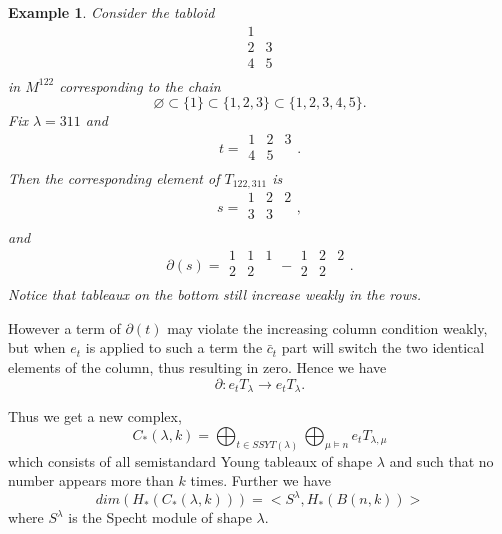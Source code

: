 \documentclass{amsart}
\newtheorem{example}[theorem]{Example}
\begin{document}
\begin{example}

Consider the tabloid  $$\begin{array}{cc}
    1 &   \\
    2 & 3 \\
    4 & 5 \\
  \end{array}$$ in $M^{122}$ corresponding to the chain 
$$ \varnothing \subset \{1\} \subset \{1,2,3\} \subset \{1,2,3,4,5\}.$$ Fix $\lambda=311$ and 
  $$t = \begin{array}{ccc} 1 & 2 & 3 \\ 4 & 5 & \\ \end{array}.$$ Then the corresponding element of $T_{122, 311}$ is
  $$s = \begin{array}{ccc} 1 & 2 & 2 \\ 3 & 3\\ \end{array},$$ and 
  $$\partial(s) = \begin{array}{ccc} 1 & 1 & 1\\ 2 & 2\\ \end{array} - \begin{array}{ccc} 1 & 2 & 2 \\ 2 & 2\\ 
    \end{array}.$$
  Notice that tableaux on the bottom still increase weakly in the rows.
\end{example}

However a term of $\partial(t)$ may violate the
increasing column condition weakly, but when $e_t$ is applied to such a term the ${\bar c}_t$ part will switch the two 
identical elements of the column, thus resulting in zero. Hence we have
$$\partial \colon e_t T_{\lambda} \longrightarrow e_t T_{\lambda}.$$

Thus we get a new complex, 
$$C_*(\lambda, k) = \bigoplus_{t \in SSYT(\lambda)} \bigoplus_{\mu \models n} e_t T_{\lambda, \mu}$$ which consists of 
all semistandard Young tableaux of shape $\lambda$ and such that no number appears more than $k$ times. Further we have
$$dim(H_*(C_*(\lambda, k))) = <S^\lambda, H_*(B(n, k))>$$ where $S^\lambda$ is the Specht module of shape $\lambda$. 
\end{document}

